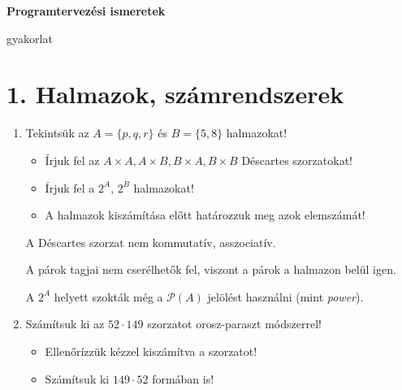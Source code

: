 \documentclass[a4paper]{article}
\newenvironment{comment}
{\color{Green}}{\bigskip}
\begin{document}


\begin{center}
    \Huge \textbf{Programtervezési ismeretek}
    
	\bigskip
	
	\Large gyakorlat
\end{center}

\bigskip

\section*{1. Halmazok, számrendszerek}

\begin{enumerate}

\item

Tekintsük az $A = \{p, q, r\}$ és $B = \{5, 8\}$ halmazokat!
\begin{itemize}
	\item Írjuk fel az $A \times A, A \times B, B \times A, B \times B$ Déscartes szorzatokat!
	\item Írjuk fel a $2^A$, $2^B$ halmazokat!
	\item A halmazok kiszámítása előtt határozzuk meg azok elemszámát!
\end{itemize}

\begin{comment}
A Déscartes szorzat nem kommutatív, asszociatív.

A párok tagjai nem cserélhetők fel, viszont a párok a halmazon belül igen.

A $2^A$ helyett szokták még a $\mathcal{P}(A)$ jelölést használni (mint \textit{power}).
\end{comment}

\item

Számítsuk ki az $52 \cdot 149$ szorzatot orosz-paraszt módszerrel!
\begin{itemize}
	\item Ellenőrízzük kézzel kiszámítva a szorzatot!
	\item Számítsuk ki $149 \cdot 52$ formában is!
\end{itemize}


\end{enumerate}
\end{document}
